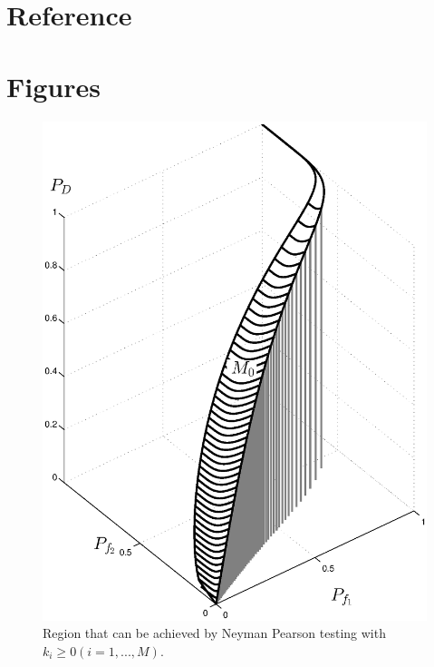 \documentclass[12pt,journal,a4paper,twoside,onecolumn]{IEEEtran}
\begin{document}
\begin{spacing}{2.5}
\section{Reference}
\newpage

\section{Figures}
\newpage

\begin{figure}[!t]
\centering
\includegraphics[width=12cm]{singleROC.eps}
\caption{Region that can be achieved by Neyman Pearson testing with $k_i \geq 0 (i=1, ..., M)$.}
\label{pic: surface for m0 gaussian}
\end{figure}
\newpage
\begin{figure}[!t]
\centering

\end{figure}
\end{spacing}
\end{document}

